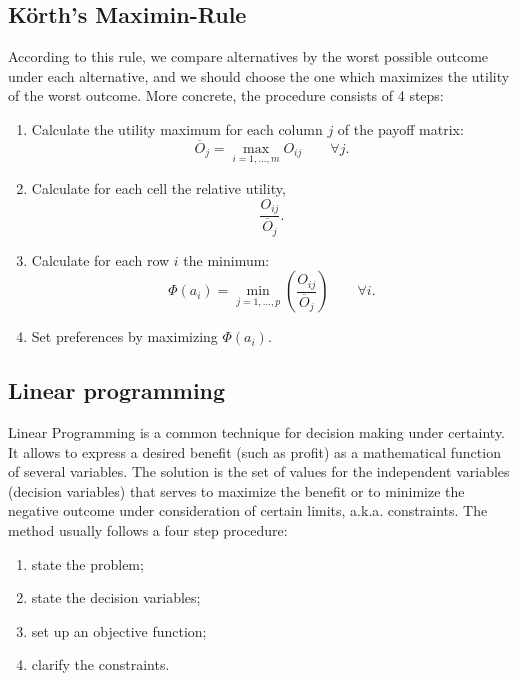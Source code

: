 \documentclass[
  12pt,
  oneside]{book}
\providecommand{\tightlist}{%
  \setlength{\itemsep}{0pt}\setlength{\parskip}{0pt}}
\theoremstyle{definition}
\theoremstyle{definition}
\theoremstyle{definition}
\theoremstyle{definition}
\theoremstyle{remark}
\begin{document}
\hypertarget{kuxf6rths-maximin-rule}{%
\subsection*{Körth's Maximin-Rule}\label{kuxf6rths-maximin-rule}}

According to this rule, we compare alternatives by the worst possible outcome under each alternative, and we should choose the one which maximizes the utility of the worst outcome. More concrete, the procedure consists of 4 steps:

\begin{enumerate}
\def\labelenumi{\arabic{enumi}.}
\tightlist
\item
  Calculate the utility maximum for each column \(j\) of the payoff matrix: \[\overline{O}_j=\max_{i=1,\dots,m}{O_{ij}}\qquad \forall j.\]
\item
  Calculate for each cell the relative utility, \[\frac{O_{ij}}{\overline{O}_j}.\]
\item
  Calculate for each row \(i\) the minimum: \[\Phi(a_i)=\min_{j=1,\dots,p}\left(\frac{O_{ij}}{\overline{O}_j}\right) \qquad \forall i.\]
\item
  Set preferences by maximizing \(\Phi(a_i)\).
\end{enumerate}

\hypertarget{linear-programming}{%
\subsection{Linear programming}\label{linear-programming}}

Linear Programming is a common technique for decision making under certainty. It allows to express a desired benefit (such as profit) as a mathematical function of several variables. The solution is the set of values for the independent variables (decision variables) that serves to maximize the benefit or to minimize the negative outcome under consideration of certain limits, a.k.a. constraints. The method usually follows a four step procedure:

\begin{enumerate}
\def\labelenumi{\arabic{enumi}.}
\tightlist
\item
  state the problem;
\item
  state the decision variables;
\item
  set up an objective function;
\item
  clarify the constraints.
\end{enumerate}
\end{document}
